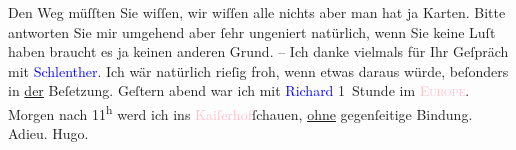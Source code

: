            Den Weg müſſten Sie wiſſen, wir wiſſen alle nichts aber man hat ja Karten. Bitte
                    antworten Sie mir umgehend aber ſehr ungeniert natürlich, wenn Sie keine Luſt
                    haben braucht es ja keinen anderen Grund. – Ich danke vielmals {\pb}für Ihr Geſpräch mit
                        \textcolor{blue}{Schlenther}{}\ledrightnote{\textcolor{blue}{Paul Schlenther}}. Ich wär natürlich rieſig
                    froh, wenn etwas daraus würde, beſonders in \uline{der}
                    Beſetzung.\pend
           \pstart
           Geſtern abend war ich mit \textcolor{blue}{Richard}{}\ledrightnote{\textcolor{blue}{Richard Beer-Hofmann}} 1 Stunde im
                        \textcolor{pink}{\textsc{Europe}}{}\ledrightnote{\textcolor{pink}{Café de l’Europe}}.\pend
           \pstart
           Morgen nach 11\textsuperscript{h} werd ich ins \textcolor{pink}{Kaiſerhof}{}\ledrightnote{\textcolor{pink}{Café Kaiserhof (Inh. Johann Wortner)}}{ }ſchauen,
                        \uline{ohne} gegenſeitige Bindung. Adieu.\pend
           \pstart \spacefill\mbox{Hugo.}\pend{}\endnumbering{}  
      